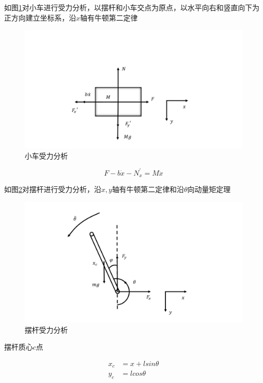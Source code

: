 如图\ref{fig:car}对小车进行受力分析，以摆杆和小车交点为原点，以水平向右和竖直向下为正方向建立坐标系，沿$x$轴有牛顿第二定律

\begin{figure}[hbpt]
\centering
\includegraphics[width=12cm]{car.jpg}
\caption{小车受力分析}\label{fig:car}
\end{figure}


\begin{equation}
F-b\dot x-N_x^{'}=M\ddot x
\end{equation}

如图\ref{fig:stick}对摆杆进行受力分析，沿$x,y$轴有牛顿第二定律和沿$\theta$向动量矩定理

\begin{figure}[hbpt]
\centering
\includegraphics[width=12cm]{stick.jpg}
\caption{摆杆受力分析}\label{fig:stick}
\end{figure}

摆杆质心$c$点
	
\begin{equation}
\begin{aligned}
x_c&=x+lsin\theta\\
y_c&=lcos\theta\\
\end{aligned}
\end{equation}

